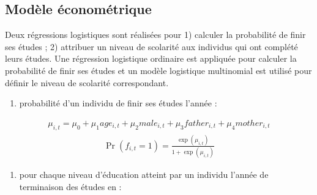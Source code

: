 \documentclass[letterpaper,10pt,french]{sphinxmanual}
\begin{document}
\subsection{Modèle économétrique}
\label{\detokenize{transition_models:id1}}
Deux régressions logistiques sont réalisées pour 1) calculer la probabilité de finir ses études ; 2) attribuer un niveau de scolarité aux individus qui ont complété leurs études. Une régression logistique ordinaire est appliquée pour calculer la probabilité de finir ses études et un modèle logistique multinomial est utilisé pour définir le niveau de scolarité correspondant.
\begin{enumerate}
%
\item {} 
probabilité d’un individu  de finir ses études  l’année  :

\end{enumerate}
\begin{equation*}
\begin{split}\mu_{i,t} = \mu_{0} + \mu_{1} age_{i,t} + \mu_{2} male_{i,t} + \mu_{3} father_{i,t} + \mu_{4} mother_{i,t}\end{split}
\end{equation*}\begin{equation*}
\begin{split}\Pr(f_{i,t}=1) = \frac{\exp(\mu_{i,t})}{1+\exp(\mu_{i,t})}\end{split}
\end{equation*}\begin{enumerate}
%
\setcounter{enumi}{1}
\item {} 
pour chaque niveau d’éducation  atteint par un individu  l’année de terminaison des études en  :

\end{enumerate}
\end{document}
